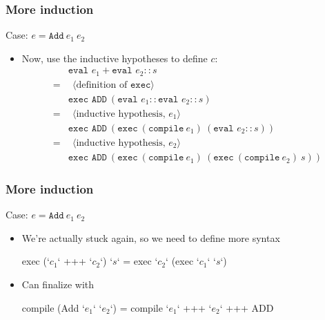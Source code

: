 \documentclass[usenames,dvipsnames]{beamer}
\begin{document}
\begin{frame}[fragile]
  \frametitle{More induction}
  \begin{totop}
    Case: $e = \texttt{Add}\ e_1\ e_2$
  \end{totop}

  \begin{itemize}
    \item Now, use the inductive hypotheses to define $c$:
      \begin{align*}
          &\texttt{eval }e_1+\texttt{eval }e_2 :: s \\
        = &\ \ \langle \text{definition of }\texttt{exec} \rangle \\
          &\texttt{exec ADD}\ (\texttt{eval }e_1 :: \texttt{eval }e_2 :: s) \\
        = &\ \ \langle \text{inductive hypothesis, $e_1$} \rangle \\
          &\texttt{exec ADD}\ (
            \texttt{exec}\ (\texttt{compile}\ e_1)\ (\texttt{eval }e_2 :: s))
            \\
        = &\ \ \langle \text{inductive hypothesis, $e_2$} \rangle \\
          &\texttt{exec ADD}\ (
            \texttt{exec}\ (\texttt{compile}\ e_1)\ (
              \texttt{exec}\ (\texttt{compile}\ e_2)\ s))
      \end{align*}
  \end{itemize}
\end{frame}


\begin{frame}[fragile]
  \frametitle{More induction}
  \begin{totop}
    Case: $e = \texttt{Add}\ e_1\ e_2$
  \end{totop}

  \begin{itemize}
    \item We're actually stuck again, so we need to define more syntax

      \begin{code}
        exec (`$c_1$` +++ `$c_2$`) `$s$` = exec `$c_2$` (exec `$c_1$` `$s$`)
      \end{code}

    \item Can finalize with

      \begin{code}
        compile (Add `$e_1$` `$e_2$`) = compile `$e_1$` +++ `$e_2$` +++ ADD
      \end{code}
  \end{itemize}
\end{frame}
\end{document}
